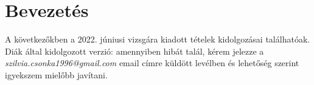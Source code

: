 \chapter*{Bevezetés} %
\label{ch:bevezetes}

A következőkben a 2022. júniusi vizsgára kiadott tételek kidolgozásai találhatóak. Diák által kidolgozott verzió: amennyiben hibát talál, kérem jelezze a \textit{szilvia.csonka1996@gmail.com} email címre küldött levélben és lehetőség szerint igyekszem mielőbb javítani.